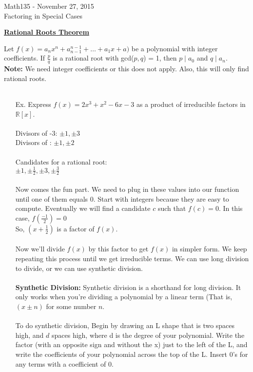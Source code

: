 \documentclass{letter}
\begin{document}
	\begin{center}
		\LARGE Math135 - November 27, 2015\\
		\large Factoring in Special Cases
	\end{center}
	\vspace{0.25 in}
	\underline{\textbf{Rational Roots Theorem}}
	
	Let $f(x) = a_nx^n + a_{n-1}^{n-1} + \dots + a_1x + a)$ be a polynomial with integer coefficients. If $\frac{p}{q}$ is a rational root with gcd($p, q$) = 1, then $p \mid a_0$ and $q \mid a_n$.\\
	\textbf{Note: } We need integer coefficients or this does not apply. Also, this will only find rational roots.\\\\
	\begin{itemize}
		\item[Ex. ] Express $f(x) = 2x^3 + x^2 - 6x - 3$ as a product of irreducible factors in $\mathbb{R} \left[ x \right]$.\\\\
		Divisors of -3: $\pm 1, \pm 3$\\
		Divisors of : $\pm 1, \pm 2$\\\\
		Candidates for a rational root:\\
		$\pm 1, \pm \frac{1}{2}, \pm 3, \pm \frac{3}{2}$\\\\
		Now comes the fun part. We need to plug in these values into our function until one of them equals 0. Start with integers because they are easy to compute. Eventually we will find a candidate $c$ such that $f(c) = 0$. In this case, $f(\frac{-1}{2}) = 0$\\
		So, $(x+\frac{1}{2})$ is a factor of $f(x)$.\\\\
		Now we'll divide $f(x)$ by this factor to get $f(x)$ in simpler form. We keep repeating this process until we get irreducible terms.  We can use long division to divide, or we can use synthetic division.\\\\
		\textbf{Synthetic Division: } Synthetic division is a shorthand for long division. It only works when you're dividing a polynomial by a linear term (That is, $(x \pm n)$ for some number $n$.\\\\
		To do synthetic division, Begin by drawing an L shape that is two spaces high, and $d$ spaces high, where d is the degree of your polynomial. Write the factor (with an opposite sign and without the x) just to the left of the L, and write the coefficients of your polynomial across the top of the L. Insert 0's for any terms with a coefficient of 0.\\

\end{itemize}
\end{document}
